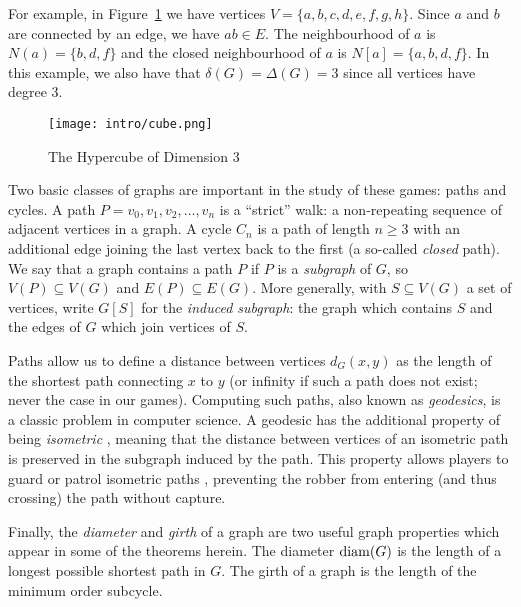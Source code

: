 For example, in Figure~\ref{fig:hyper-cube} we have vertices $V = \{ a, b, c, d, e, f, g, h \}$.
Since $a$ and $b$ are connected by an edge, we have $ab \in E$.
The neighbourhood of $a$ is $N(a) = \{ b,d,f \}$ and the closed neighbourhood of $a$ is
$N[a] = \{ a, b, d, f \}$. In this example, we also have that $\delta(G) = \Delta(G) = 3$ since all vertices have degree 3.

\begin{figure}
\centering
\texttt{[image: intro/cube.png]}
\caption{The Hypercube of Dimension 3 \label{fig:hyper-cube}}
\end{figure}

Two basic classes of graphs are important in the study of these games: paths and cycles.
A path $P = v_0, v_1, v_2, \dots , v_n$ is a ``strict'' walk: a non-repeating sequence of
adjacent vertices in a graph. A cycle $C_n$ is a path of length $n \geq 3$ with an additional edge joining the last vertex back to the first (a so-called \textit{closed} path).
We say that a graph contains a path $P$ if $P$ is a \textit{subgraph} of $G$, so $V(P) \subseteq V(G)$ and $E(P) \subseteq E(G)$. More generally, with $S \subseteq V(G)$ a set of vertices, write $G[S]$ for the \textit{induced subgraph}: the graph which contains $S$ and the edges of $G$ which join vertices of $S$.

Paths allow us to define a distance between vertices $d_G(x,y)$ as the length of the shortest path connecting $x$ to $y$ (or infinity if such a path does not exist; never the case in our games). Computing such paths, also known as \textit{geodesics}, is a classic problem in computer science.
A geodesic has the additional property of being \textit{isometric} \cite{pan2006isometric}, meaning that the distance between vertices of an isometric path is preserved in the subgraph induced by the path. This property allows players to guard or patrol isometric paths \cite{aigner1984game}, preventing
the robber from entering (and thus crossing) the path without capture.

Finally, the \textit{diameter} and \textit{girth} of a graph are two useful graph properties which appear in some of the theorems herein. The diameter $\operatorname{diam}(G)$ is the length of a longest possible shortest path in $G$. The girth of a graph is the length of the minimum order subcycle.
